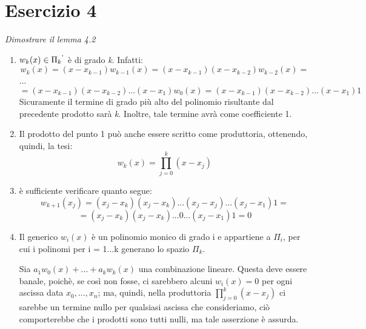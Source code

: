 \section{Esercizio 4}
\label{sub:Esercizio 4}
\emph{Dimostrare il lemma 4.2}
\begin{sol}
	\begin{enumerate}
		\item $w_{k}(x)\in \Pi_{k}\textsuperscript{'}$ è di grado \textit{k}. Infatti:
			\[w_{k}(x)=(x-x_{k-1})\text{}w_{k-1}(x) = (x-x_{k-1})\text{}(x-x_{k-2})\text{}w_{k-2}(x) =\]
		...
			\[= (x-x_{k-1})\text{}(x-x_{k-2})\text{}...\text{}(x-x_{1})\text{}w_{0}(x) = (x-x_{k-1})\text{}(x-x_{k-2})\text{}...\text{}(x-x_{1})\text{}1\]
		Sicuramente il termine di grado più alto del polinomio risultante dal precedente prodotto sarà \textit{k}. Inoltre, tale termine avrà come coefficiente 1.
		\item Il prodotto del punto 1 può anche essere scritto come produttoria, ottenendo, quindi, la tesi:
			\[ w_{k}(x)=\prod\limits_{j=0}^k (x-x_{j}) \]
		\item è sufficiente verificare quanto segue:
			\[
			w_{k+1}(x_{j})=(x_{j}-x_{k})\text{}(x_{j}-x_{k})\text{}...\text{}(x_{j}-x_{j})\text{}...\text{}(x_{j}-x_{1})\text{}1 =
		\]
				\[
			=(x_{j}-x_{k})\text{}(x_{j}-x_{k})\text{}...\text{}0\text{}...\text{}(x_{j}-x_{1})\text{}1 = 0
		\]
		\item Il generico $w_{i}(x)$ è un polinomio monico di grado i e appartiene a $\Pi_{i}$, per cui i polinomi per i = 1...k generano lo spazio $\Pi_{k}$.

	Sia $a_{1}w_{0}(x)+...+a_{k}w_{k}(x)$ una combinazione lineare.
	Questa deve essere banale, poichè, se così non fosse, ci sarebbero alcuni $w_{i}(x)=0$ per ogni ascissa data
	$x_{0},..., x_{n}$; ma, quindi, nella produttoria $\prod\limits_{j=0}^k (x-x_{j}) $
	ci sarebbe un termine nullo per qualsiasi ascissa che consideriamo, ciò comporterebbe che i prodotti sono tutti nulli,
	ma tale asserzione è assurda.
\end{enumerate}
\end{sol}


